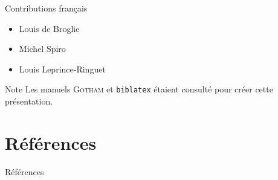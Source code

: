 \documentclass[aspectratio=43]{beamer}
\begin{document}
\begin{frame}{Contributions français}
	\begin{itemize}
		\item Louis de Broglie

		\item Michel Spiro

		\item Louis Leprince-Ringuet
	\end{itemize}
\end{frame}



\begin{frame}{Note}
	Les manuels \textsc{Gotham}  et \texttt{biblatex}
	 étaient consulté pour créer cette présentation.
\end{frame}



\section{Références}
\begin{frame}[allowframebreaks]{Références}
	\printbibliography[heading=none]
\end{frame}
\end{document}
